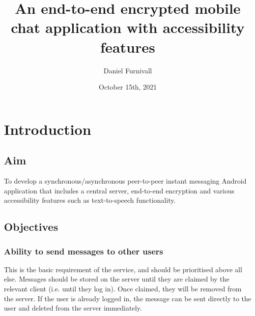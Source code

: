 \documentclass{mproj}
\begin{document}
\title{An end-to-end encrypted mobile chat application with accessibility features}
\author{Daniel Furnivall}
\date{October 15th, 2021}
\maketitle




\newpage

\tableofcontents

\chapter{Introduction}\label{intro}

\section{Aim}
To develop a synchronous/asynchronous peer-to-peer instant messaging Android application that includes a central server, end-to-end encryption and various accessibility features such as text-to-speech functionality.
\section{Objectives}
\subsection{Ability to send messages to other users}
This is the basic requirement of the service, and should be prioritised above all else. Messages should be stored on the server until they are claimed by the relevant client (i.e. until they log in). Once claimed, they will be removed from the server. If the user is already logged in, the message can be sent directly to the user and deleted from the server immediately.
\end{document}
